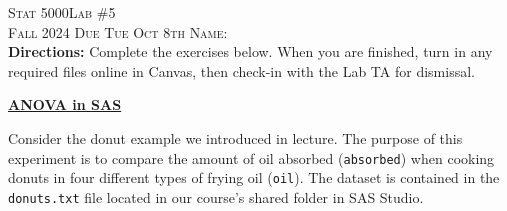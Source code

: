 \documentclass[11pt]{article}
\begin{document}
\large \noindent \textsc{Stat 5000}\hfill \large{\textsc{Lab \#5}} \hfill {} \\
\large \textsc{Fall 2024}  \hfill \textsc{Due Tue Oct 8th} \hfill \textsc{Name:} \underline{\hspace{2in}} \\

\noindent \textbf{Directions:} Complete the exercises below. When you are finished, turn in any required files online in Canvas, then check-in with the Lab TA for dismissal.
\\ \underline{\hspace{7in}}
\vspace{14pt}


\textbf{\underline{ANOVA in SAS}}

Consider the donut example we introduced in lecture. The purpose of this experiment is to compare the amount of oil absorbed (\texttt{absorbed}) when cooking donuts in four different types of frying oil (\texttt{oil}). The dataset is contained in the \texttt{donuts.txt} file located in our course's shared folder in SAS Studio.
\end{document}
